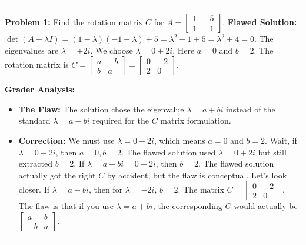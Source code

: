\documentclass[11pt, letterpaper]{article}
\theoremstyle{definition}
\theoremstyle{remark}
\begin{document}
\vspace{1em}
\hrule
\vspace{1em}

\textbf{Problem 1:} Find the rotation matrix $C$ for $A = \begin{bmatrix} 1 & -5 \\ 1 & -1 \end{bmatrix}$.
\newline
\textbf{Flawed Solution:}
$\det(A - \lambda I) = (1-\lambda)(-1-\lambda) + 5 = \lambda^2 - 1 + 5 = \lambda^2 + 4 = 0$.
The eigenvalues are $\lambda = \pm 2i$.
We choose $\lambda = 0 + 2i$. Here $a = 0$ and $b = 2$.
The rotation matrix is $C = \begin{bmatrix} a & -b \\ b & a \end{bmatrix} = \begin{bmatrix} 0 & -2 \\ 2 & 0 \end{bmatrix}$.

\textbf{Grader Analysis:}
\begin{itemize}
    \item \textbf{The Flaw:} The solution chose the eigenvalue $\lambda = a + bi$ instead of the standard $\lambda = a - bi$ required for the $C$ matrix formulation.
    \item \textbf{Correction:} We must use $\lambda = 0 - 2i$, which means $a = 0$ and $b = 2$. Wait, if $\lambda = 0 - 2i$, then $a=0, b=2$. The flawed solution used $\lambda = 0 + 2i$ but still extracted $b=2$. If $\lambda = a - bi = 0 - 2i$, then $b=2$. The flawed solution actually got the right $C$ by accident, but the flaw is conceptual. Let's look closer. If $\lambda = a - bi$, then for $\lambda = -2i$, $b=2$. The matrix $C = \begin{bmatrix} 0 & -2 \\ 2 & 0 \end{bmatrix}$. The flaw is that if you use $\lambda = a+bi$, the corresponding $C$ would actually be $\begin{bmatrix} a & b \\ -b & a \end{bmatrix}$.
\end{itemize}

\vspace{1em}
\hrule
\vspace{1em}
\end{document}
